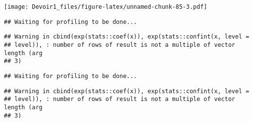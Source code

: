 \documentclass[]{article}
\newenvironment{Shaded}{\begin{snugshade}}{\end{snugshade}}
\newcommand{\KeywordTok}[1]{\textcolor[rgb]{0.13,0.29,0.53}{\textbf{#1}}}
\newcommand{\DataTypeTok}[1]{\textcolor[rgb]{0.13,0.29,0.53}{#1}}
\newcommand{\DecValTok}[1]{\textcolor[rgb]{0.00,0.00,0.81}{#1}}
\newcommand{\StringTok}[1]{\textcolor[rgb]{0.31,0.60,0.02}{#1}}
\newcommand{\OperatorTok}[1]{\textcolor[rgb]{0.81,0.36,0.00}{\textbf{#1}}}
\newcommand{\NormalTok}[1]{#1}
\begin{document}
\texttt{[image: Devoir1\_files/figure-latex/unnamed-chunk-85-3.pdf]}

\begin{Shaded}
\end{Shaded}

\begin{verbatim}
## Waiting for profiling to be done...
\end{verbatim}

\begin{verbatim}
## Warning in cbind(exp(stats::coef(x)), exp(stats::confint(x, level =
## level)), : number of rows of result is not a multiple of vector length (arg
## 3)
\end{verbatim}

\begin{verbatim}
## Waiting for profiling to be done...
\end{verbatim}

\begin{verbatim}
## Warning in cbind(exp(stats::coef(x)), exp(stats::confint(x, level =
## level)), : number of rows of result is not a multiple of vector length (arg
## 3)
\end{verbatim}
\end{document}
